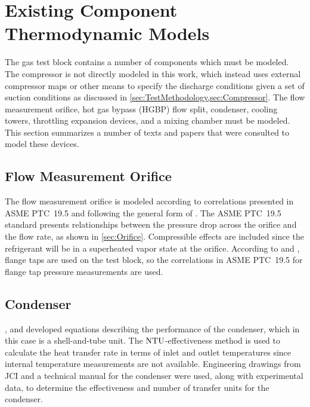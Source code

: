 
\section{Existing Component Thermodynamic Models}
The  gas test block contains a number of components which must be modeled. 
The compressor is not directly modeled in this work, 
which instead uses external compressor maps or other means 
to specify the discharge conditions given a set of suction conditions
as discussed in \cref{sec:TestMethodology,sec:Compressor}. 
The flow measurement orifice, hot gas bypass (HGBP) flow split, condenser, cooling towers, 
throttling expansion devices, and a mixing chamber must be modeled. 
This section summarizes a number of texts and papers that were consulted to model these devices.

\subsection{Flow Measurement Orifice}
The flow measurement orifice is modeled according to correlations presented in 
ASME PTC~19.5 \parencite{ptc19} and following the general form of \textcite{munson2009}. 
The ASME PTC~19.5 standard presents relationships between 
the pressure drop across the orifice and the flow rate, as shown in \cref{sec:Orifice}. 
Compressible effects are included since the refrigerant will be in a 
superheated vapor state at the orifice.
According to \textcite{trevino2012} and \textcite{flow1984}, flange taps
are used on the test block, so the correlations in ASME PTC~19.5
for flange tap pressure measurements are used.

\subsection{Condenser}
\textcites{incropera2007}{incropera1985}, and \textcite{kays1984} 
developed equations describing the performance of the condenser, 
which in this case is a shell-and-tube unit. 
The $\mathrm{NTU}$-effectiveness method is used to calculate the heat transfer rate
in terms of inlet and outlet temperatures since internal temperature measurements are not available. 
Engineering drawings from JCI \parencite{cond1983} and a technical manual
for the condenser \parencite{condman} were used, along with experimental data,
to determine the effectiveness and number of transfer units for the condenser.

